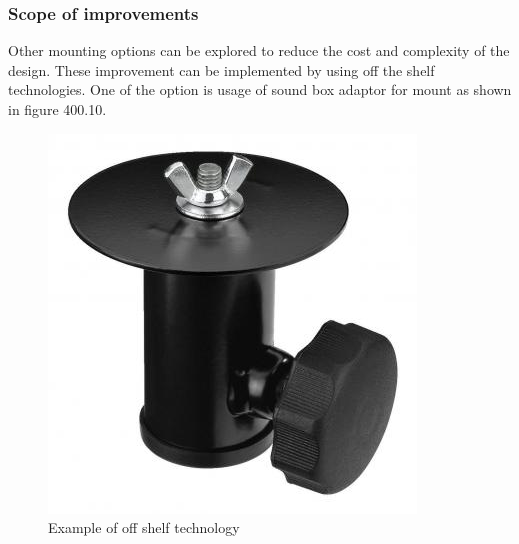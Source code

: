 \subsubsection*{Scope of improvements}
Other mounting options can be explored to reduce the cost and complexity of the design. These improvement can be implemented by using off the shelf technologies. One of the option is usage of sound box adaptor for mount as shown in figure 400.10.     

\begin{figure}[H]
	\centering
	\includegraphics[width=0.2\linewidth]{../art/buy mount.jpg}
	\caption{Example of off shelf technology}
\end{figure}